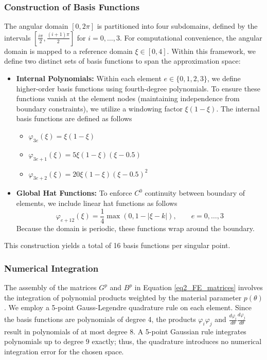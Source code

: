 \documentclass[oneside]{article}
\newcounter{reviewer}
\newcounter{point}[reviewer]
\begin{document}
\subsubsection{Construction of Basis Functions}
The angular domain $[0, 2\pi]$ is partitioned into four subdomains, defined by the intervals $[\frac{i\pi}{2}, \frac{(i+1)\pi}{2}]$ for $i = 0, \dots, 3$. For computational convenience, the angular domain is mapped to a reference domain $\xi \in [0, 4]$. Within this framework, we define two distinct sets of basis functions to span the approximation space:

\begin{itemize}
    \item \textbf{Internal Polynomials:} Within each element $e \in \{0, 1, 2, 3\}$, we define higher-order basis functions using fourth-degree polynomials. To ensure these functions vanish at the element nodes (maintaining independence from boundary constraints), we utilize a windowing factor $\xi(1-\xi)$. The internal basis functions are defined as follows
    \begin{itemize}
        \item $\varphi_{3e}(\xi) = \xi(1-\xi)$
        \item $\varphi_{3e+1}(\xi) = 5\xi(1-\xi)(\xi-0.5)$
        \item $\varphi_{3e+2}(\xi) = 20\xi(1-\xi)(\xi-0.5)^2$
    \end{itemize}
    
    \item \textbf{Global Hat Functions:} To enforce $C^0$ continuity between boundary of elements, we include linear hat functions as follows
    \begin{equation}
        \varphi_{e + 12}(\xi) = \frac{1}{4} \max(0, 1 - |\xi - k|), \qquad e = 0, \ldots, 3
    \end{equation}
    Because the domain is periodic, these functions wrap around the boundary.
\end{itemize}

\noindent This construction yields a total of 16 basis functions per singular point.

\subsubsection{Numerical Integration}
The assembly of the matrices $G^p$ and $B^p$ in Equation \eqref{eq2_FE_matrices} involves the integration of polynomial products weighted by the material parameter $p(\theta)$. We employ a 5-point Gauss-Legendre quadrature rule on each element. Since the basis functions are polynomials of degree 4, the products $\varphi_i \varphi_j$ and $\frac{d\varphi_i}{d\theta} \frac{d\varphi_j}{d\theta}$ result in polynomials of at most degree 8. A 5-point Gaussian rule integrates polynomials up to degree $9$ exactly; thus, the quadrature introduces no numerical integration error for the chosen space.
\end{document}
